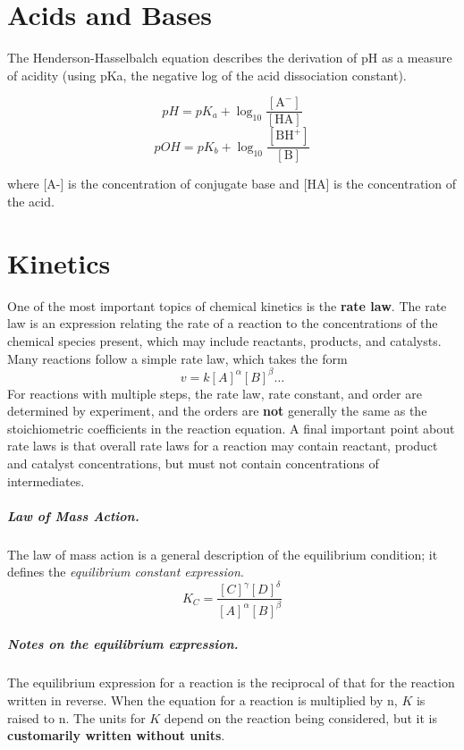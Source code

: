 \documentclass[oneside]{book} %
\theoremstyle{plain}
\begin{document}

\chapter{Acids and Bases}

The Henderson-Hasselbalch equation describes the derivation of pH as a
measure of acidity (using pKa, the negative log of the acid dissociation
constant).

\[pH = pK_a + \log_{10} \frac{[\text{A}^-]}{[\text{HA}]}\]
\[pOH = pK_b + \log_{10} \frac{[\text{BH}^+]}{[\text{B}]}\]

where [A-] is the concentration of conjugate base and [HA] is the concentration
of the acid.


\chapter{Kinetics}

One of the most important topics of chemical kinetics is the \textbf{rate law}.
The rate law is an expression relating the rate of a reaction to the
concentrations of the chemical species present, which may include reactants,
products, and catalysts. Many reactions follow a simple rate law, which takes
the form
\[v = k [A]^\alpha [B]^\beta \ldots\]
For reactions with multiple steps, the rate law, rate constant, and order are
determined by experiment, and the orders are \textbf{not} generally the same as
the stoichiometric coefficients in the reaction equation.  A final important
point about rate laws is that overall rate laws for a reaction may contain
reactant, product and catalyst concentrations, but must not contain
concentrations of intermediates.

\paragraph{Law of Mass Action.} The law of mass action is a general description
of the equilibrium condition; it defines the \textit{equilibrium constant
expression}.
\[K_C = \frac{[C]^\gamma [D]^\delta}{[A]^\alpha [B]^\beta}\]

\paragraph{Notes on the equilibrium expression.} The equilibrium expression for
a reaction is the reciprocal of that for the reaction written in reverse. When
the equation for a reaction is multiplied by n, \(K\) is raised to n.  The
units for \(K\) depend on the reaction being considered, but it is
\textbf{customarily written without units}.
\end{document}
